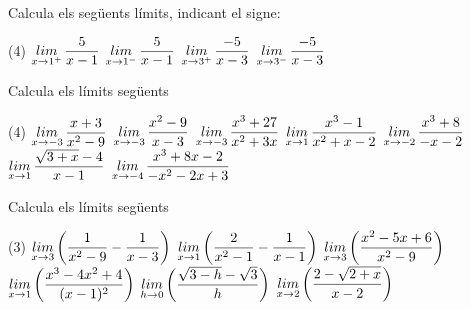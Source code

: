 \begin{mylist}
	
	\exer  Calcula els següents límits, indicant el signe:
	\begin{tasks}(4) 
		\task  $\limx{1^{+} } \dfrac{5}{x-1} $ \task  $\limx{1^{-} } \dfrac{5}{x-1} $  \task  $\limx{3^{+} } \dfrac{-5}{x-3} $  \task $\limx{3^{-} } \dfrac{-5}{x-3} $
	\end{tasks}
	\answers{[$+\infty$, $-\infty$, $-\infty$, $+\infty$]}
\vso	

\exer[1] Calcula els límits següents
\begin{tasks}(4) 
	\task  $\limx{-3} \dfrac{x+3}{x^{2} -9} $   \task $\limx{-3} \dfrac{x^{2} -9}{x-3} $   \task $\limx{-3} \dfrac{x^{3} +27}{x^{2} +3x} $   \task $\limx{1} \dfrac{x^{3} -1}{x^{2} +x-2} $
	\task $\limx{-2} \dfrac{x^{3} +8}{-x-2} $   \task $\limx{1} \dfrac{\sqrt{3+x} -4}{x-1} $  \task $\limx{-4} \dfrac{x^{3} +8x-2}{-x^{2} -2x+3} $
\end{tasks}
\answers{[--1/6, 0, --9, 1, --12, $\mp\infty$, 98/5]}

\vso	
\exer[1] Calcula els límits següents
\begin{tasks}(3) 
	\task $\limx{3} \left(\dfrac{1}{x^2-9} - \dfrac{1}{x-3} \right)$
	\task $\limx{1} \left(\dfrac{2}{x^2-1} - \dfrac{1}{x-1} \right)$
	\task $\limx{3} \left(\dfrac{x^2 -5x+6}{x^2-9} \right)$
	\task $\limx{1} \left(\dfrac{x^3-4x^2+4}{(x-1)^2}  \right)$
	\task $\limx[h]{0} \left(\dfrac{\sqrt{3-h} - \sqrt{3}}{h} \right)$
	\task $\limx{2} \left(\dfrac{2 - \sqrt{2+x}}{x-2} \right)$
\end{tasks}

\end{mylist}

